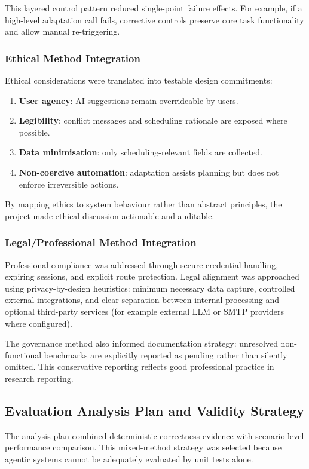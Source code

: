 \documentclass[12pt]{article}
\begin{document}
This layered control pattern reduced single-point failure effects. For example, if a high-level adaptation call fails, corrective controls preserve core task functionality and allow manual re-triggering.

\subsubsection{Ethical Method Integration}
Ethical considerations were translated into testable design commitments:
\begin{enumerate}
    \item \textbf{User agency}: AI suggestions remain overrideable by users.
    \item \textbf{Legibility}: conflict messages and scheduling rationale are exposed where possible.
    \item \textbf{Data minimisation}: only scheduling-relevant fields are collected.
    \item \textbf{Non-coercive automation}: adaptation assists planning but does not enforce irreversible actions.
\end{enumerate}

By mapping ethics to system behaviour rather than abstract principles, the project made ethical discussion actionable and auditable.

\subsubsection{Legal/Professional Method Integration}
Professional compliance was addressed through secure credential handling, expiring sessions, and explicit route protection. Legal alignment was approached using privacy-by-design heuristics: minimum necessary data capture, controlled external integrations, and clear separation between internal processing and optional third-party services (for example external LLM or SMTP providers where configured).

The governance method also informed documentation strategy: unresolved non-functional benchmarks are explicitly reported as pending rather than silently omitted. This conservative reporting reflects good professional practice in research reporting.

\subsection{Evaluation Analysis Plan and Validity Strategy}
The analysis plan combined deterministic correctness evidence with scenario-level performance comparison. This mixed-method strategy was selected because agentic systems cannot be adequately evaluated by unit tests alone.
\end{document}
